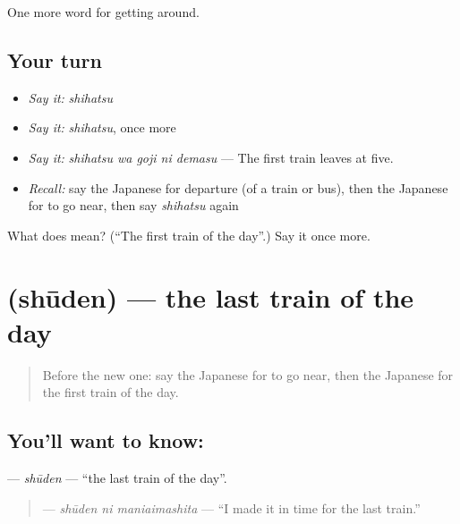 \begin{grammarlens}[title={What you've built}]
One more word for getting around.
\end{grammarlens}

\subsection*{Your turn}
\begin{itemize}
\raggedright
  \item \emph{Say it:} \emph{shihatsu}
  \item \emph{Say it:} \emph{shihatsu}, once more
  \item \emph{Say it:} \emph{shihatsu wa goji ni demasu} — The first train leaves at five.
  \item \emph{Recall:} say the Japanese for departure (of a train or bus), then the Japanese for to go near, then say \emph{shihatsu} again
\end{itemize}

\begin{tcolorbox}[breakable,colback=teal!4,colframe=teal!35!black,title={Before you move on}]
What does  mean? (\textquotedblleft{}The first train of the day\textquotedblright{}.) Say it once more.
\end{tcolorbox}
\section[\texorpdfstring{\ja{しゅうでん} (shūden)}{しゅうでん (shūden)}]{ (shūden) — the last train of the day}

\label{lesson:JA-C375-shuuden}



\begin{quote}
Before the new one: say the Japanese for to go near, then the Japanese for the first train of the day.
\end{quote}

\subsection*{You'll want to know: }
\textbf{} — \emph{shūden} — \textquotedblleft{}the last train of the day\textquotedblright{}.

\begin{quote}
\textbf{ } — \emph{shūden ni maniaimashita} — \textquotedblleft{}I made it in time for the last train.\textquotedblright{}
\end{quote}

